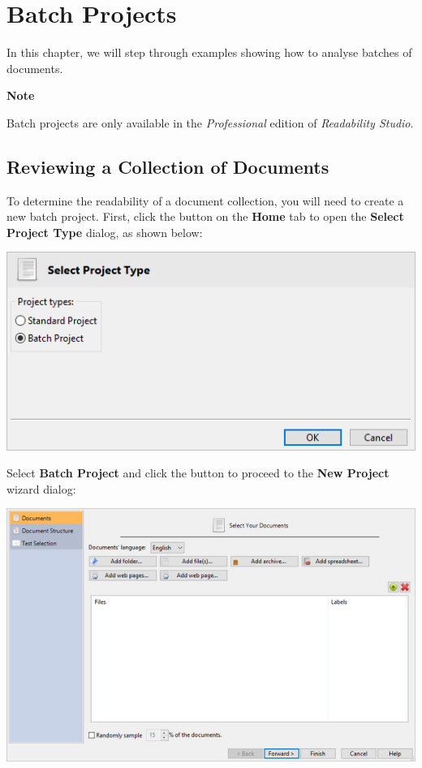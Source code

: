 \documentclass[
]{book}
\newenvironment{notesection}
    {
    \begin{tcolorbox}[colframe=mediumblue,colback=lightblue,coltext=mediumblue,arc=3mm]
    \faLightbulb[regular] \textbf{Note} \newline
    }
    {
    \end{tcolorbox}
    }
\theoremstyle{definition}
\theoremstyle{definition}
\theoremstyle{definition}
\theoremstyle{definition}
\theoremstyle{remark}
\begin{document}
\hypertarget{batch-projects}{%
\chapter{Batch Projects}\label{batch-projects}}

In this chapter, we will step through examples showing how to analyse batches of documents.

\begin{notesection}
Batch projects are only available in the \emph{Professional} edition of \emph{Readability Studio}.

\end{notesection}

\hypertarget{reviewing-a-collection-of-documents}{%
\section{Reviewing a Collection of Documents}\label{reviewing-a-collection-of-documents}}

To determine the readability of a document collection, you will need to create a new batch project. First, click the  button on the \textbf{Home} tab to open the \textbf{Select Project Type} dialog, as shown below:

\begin{center}\includegraphics[width=0.75\linewidth,]{Images/selectprojecttype} \end{center}

Select \textbf{Batch Project} and click the  button to proceed to the \textbf{New Project} wizard dialog:

\includegraphics{Images/wizardbatchselectfiles.png}
\end{document}
